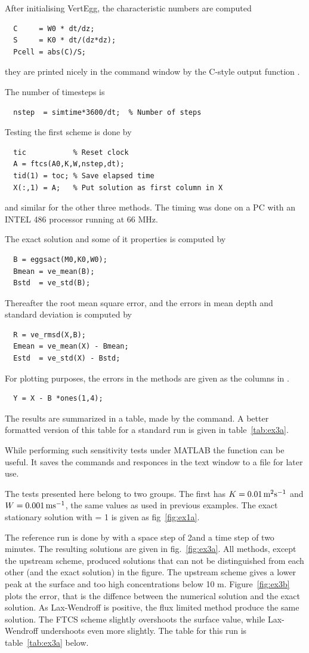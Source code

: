 After initialising VertEgg, the characteristic numbers are computed
\begin{verbatim}
  C     = W0 * dt/dz;
  S     = K0 * dt/(dz*dz);
  Pcell = abs(C)/S;
\end{verbatim}
they are printed nicely in the command window by the C-style output
function .

The number of timesteps is
\begin{verbatim}
  nstep  = simtime*3600/dt;  % Number of steps 
\end{verbatim}

Testing the first scheme is done by
\begin{verbatim}
  tic           % Reset clock
  A = ftcs(A0,K,W,nstep,dt);
  tid(1) = toc; % Save elapsed time 
  X(:,1) = A;   % Put solution as first column in X
\end{verbatim}
and similar for the other three methods. The timing was done
on a PC with an INTEL 486 processor running at 66 MHz.

The exact solution and some of it properties is computed by
\begin{verbatim}
  B = eggsact(M0,K0,W0);
  Bmean = ve_mean(B);
  Bstd  = ve_std(B);
\end{verbatim}
Thereafter the root mean square error, and the errors in mean depth
and standard deviation is computed by
\begin{verbatim}
  R = ve_rmsd(X,B);
  Emean = ve_mean(X) - Bmean;
  Estd  = ve_std(X) - Bstd;
\end{verbatim}
For plotting purposes, the errors in the methods are given 
as the columns in .
\begin{verbatim}
  Y = X - B *ones(1,4);
\end{verbatim}
The results are summarized in a table, made by the 
command.  A better formatted version of this table for a standard run
is given in table~\ref{tab:ex3a}.

While performing such sensitivity tests under MATLAB the 
function can be useful. It saves the commands and responces in the
text window to a file for later use.

The tests presented here belong to two groups. The first has
$K = 0.01 \, \mbox{m}^2 \mbox{s}^{-1}$ and $W = 0.001 \, \mbox{m} \mbox{s}^{-1}$, the same values as used in
previous examples. The exact stationary solution with  = 1 is given
as fig~\ref{fig:ex1a}. 

The reference run is done by with a space step of 2\m and a time step
of two minutes. The resulting solutions are given in
fig.~\ref{fig:ex3a}. All methods, except the upstream scheme, produced
solutions that can not be distinguished from each other (and the exact
solution) in the figure. The upstream scheme gives a lower peak at the
surface and too high concentrations below 10 m. Figure~\ref{fig:ex3b}
plots the error, that is the diffence between the numerical solution
and the exact solution. As Lax-Wendroff is positive, the flux limited
method produce the same solution. The FTCS scheme slightly overshoots
the surface value, while Lax-Wendroff undershoots even more slightly.
The table for this run is table~\ref{tab:ex3a} below.

